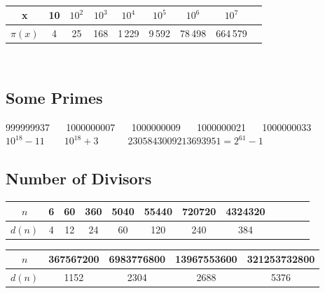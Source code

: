 \ 

\begin{tabular}{|c|c|c|c|c|c|c|c|c|}
\hline
  \cellcolor{gray!40} x&10&$10^2$&$10^3$&$10^4$&$10^5$&$10^6$&$10^7$\\ \hline
  \cellcolor{gray!40} $\pi(x)$& 4 & 25 & 168 & 1\,229 & 9\,592 & 78\,498 & 664\,579\\ \hline
\end{tabular}

\ 

\subsection{Some Primes}

999999937 $\quad$ 1000000007 $\quad$ 1000000009 $\quad$ 1000000021 $\quad$ 1000000033
$10^{18} - 11 \quad\quad 10^{18} + 3 \quad\quad\quad 2305843009213693951 = 2^{61} - 1$

\subsection{Number of Divisors}

\begin{table}[H]
    \centering
    \begin{tabular}{|c|c|c|c|c|c|c|c|c|c|c|c|}
        \hline
        \cellcolor{gray!40} $n$ & 6 & 60 & 360 & 5040 & 55440 & 720720 & 4324320 \\
        \hline
        \cellcolor{gray!40} $d(n)$ & 4 & 12 & 24 & 60 & 120 & 240 & 384\\
        \hline
    \end{tabular}
\end{table}

\vspace{-30pt}


\begin{table}[H]
    \centering
    \begin{tabular}{|c|c|c|c|c|}
        \hline
        \cellcolor{gray!40} $n$ & 367567200 & 6983776800 & 13967553600 & 321253732800
        \\
        \hline
        \cellcolor{gray!40} $d(n)$ & 1152 & 2304 &  2688 &
        5376 \\
        \hline
    \end{tabular}
\end{table}

